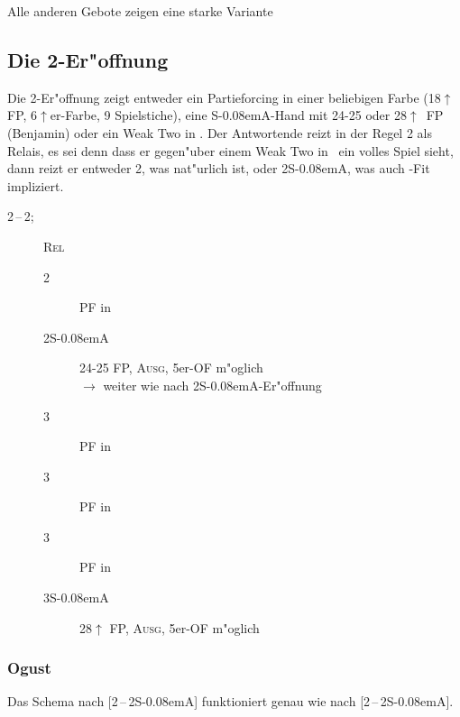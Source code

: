 \documentclass[11pt,german,twocolumn]{scrartcl}
\def\pik{\nobreak\hspace{\cardskip}\Sp\xspace}
\def\coe{\nobreak\hspace{\cardskip}\He\xspace}
\def\kar{\nobreak\hspace{\cardskip}\Di\xspace}
\def\tre{\nobreak\hspace{\cardskip}\Cl\xspace}
\def\co{\He\xspace}
\def\ka{\Di\xspace}
\def\ra{$\rightarrow$\xspace}
\def\pl{$\uparrow$\xspace}
\def\ofa{\nobreak\textsf{OF}\xspace}
\def\sa{\nobreak\textsf{S\kern-0.08emA}\xspace}
\def\SA{\nobreak\hspace{\cardskip}\sa}
\def\sep{\,--\,}
\def\bal{\textsc{Ausg}\xspace}
\def\pf{\textsc{PF}\xspace}
\def\rel{\textsc{Rel}\xspace}
\def\bdsc{\begin{description}}
\def\edsc{\end{description}}
\newcommand{\Index}[1]{#1\index{#1}}
\begin{document}
Alle anderen Gebote zeigen eine starke Variante

\subsection{Die 2\kar-Er"offnung}

Die 2\kar-Er"offnung zeigt entweder ein Partieforcing in einer beliebigen Farbe
(18\pl FP, 6\pl{}er-Farbe, 9 Spielstiche), eine \sa-Hand mit 24-25 oder
28\pl~FP (Benjamin) oder ein \Index{Weak Two} in \co. Der Antwortende reizt in der
Regel 2\coe als Relais, es sei denn dass er gegen"uber einem Weak Two in \ka\
ein volles Spiel sieht, dann reizt er entweder 2\pik, was nat"urlich ist, oder
2\SA, was auch \co-Fit impliziert.

\bdsc
\item[2\kar{}\sep2\coe;] \rel
  \bdsc
  \item[2\pik] \pf in \pik
  \item[2\SA] 24-25 FP, \bal, 5er-\ofa m"oglich \\
    \ra weiter wie nach 2\SA-Er"offnung
  \item[3\tre] \pf in \tre
  \item[3\kar] \pf in \kar
  \item[3\coe] \pf in \coe
  \item[3\SA] 28\pl FP, \bal, 5er-\ofa m"oglich
  \edsc
\edsc

\subsubsection{Ogust}

Das Schema nach [2\kar{}\sep2\SA] funktioniert genau wie nach [2\tre{}\sep2\SA].
\end{document}
